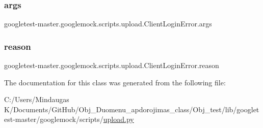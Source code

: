 \subsubsection{\texorpdfstring{args}{args}}
{\footnotesize\ttfamily googletest-\/master.\+googlemock.\+scripts.\+upload.\+Client\+Login\+Error.\+args}

\mbox{\label{classgoogletest-master_1_1googlemock_1_1scripts_1_1upload_1_1_client_login_error_ae0b42149c79b05e06d0997634c067ccd}} 
\subsubsection{\texorpdfstring{reason}{reason}}
{\footnotesize\ttfamily googletest-\/master.\+googlemock.\+scripts.\+upload.\+Client\+Login\+Error.\+reason}



The documentation for this class was generated from the following file\+:\begin{DoxyCompactItemize}
\item 
C\+:/\+Users/\+Mindaugas K/\+Documents/\+Git\+Hub/\+Obj\+\_\+\+Duomenu\+\_\+apdorojimas\+\_\+class/\+Obj\+\_\+test/lib/googletest-\/master/googlemock/scripts/\mbox{\hyperlink{_obj__test_2lib_2googletest-master_2googlemock_2scripts_2upload_8py}{upload.\+py}}\end{DoxyCompactItemize}
